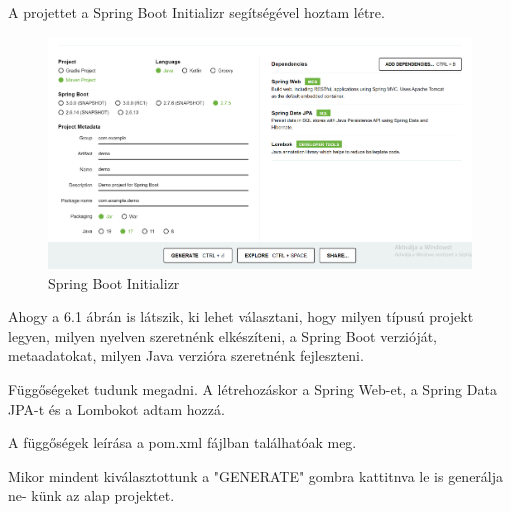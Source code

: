 

A projettet a Spring Boot Initializr segítségével hoztam létre.

\begin{figure}[h]
\centering
\includegraphics[scale=0.37]{images/Spring_init.png}
\caption{Spring Boot Initializr\cite{SpringInit}}
\label{fig:Spring_Boot_Initializr}
\end{figure}

Ahogy a 6.1 ábrán is látszik, ki lehet választani, hogy milyen típusú projekt legyen, milyen nyelven szeretnénk elkészíteni, a Spring Boot verzióját, metaadatokat, milyen Java verzióra szeretnénk fejleszteni.

Függőségeket tudunk megadni. A létrehozáskor a Spring Web-et, a Spring Data JPA-t és a Lombokot adtam hozzá.

A függőségek leírása a pom.xml fájlban találhatóak meg. 

Mikor mindent kiválasztottunk a "GENERATE" gombra kattitnva le is generálja ne-
künk az alap projektet.
\newpage

